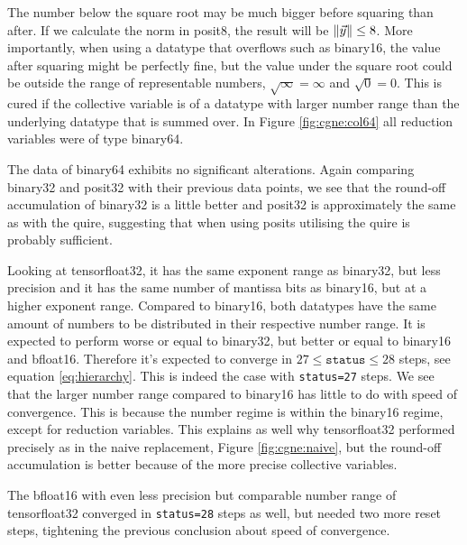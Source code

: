 \documentclass{article}
\theoremstyle{plain} %
\theoremstyle{convention} %
\theoremstyle{remark} %
\def\code#1{\texttt{#1}}
\numberwithin{equation}{section}
\begin{document}
The number below the square root may be much bigger before squaring than after. If we calculate the norm in \gls{posit8}, the result will be $\norm{\vec{y}} \leq 8$. More importantly, when using a datatype that overflows such as \gls{binary16}, the value after squaring might be perfectly fine, but the value under the square root could be outside the range of representable numbers, $\sqrt{\infty} = \infty$ and $\sqrt{0} = 0$. This is cured if the collective variable is of a datatype with larger number range than the underlying datatype that is summed over. In Figure \ref{fig:cgne:col64} all reduction variables were of type \gls{binary64}.

The data of \gls{binary64} exhibits no significant alterations. Again comparing \gls{binary32} and \gls{posit32} with their previous data points, we see that the round-off accumulation of \gls{binary32} is a little better and \gls{posit32} is approximately the same as with the \gls{quire}, suggesting that when using posits utilising the \gls{quire} is probably sufficient.

Looking at \gls{tensorfloat32}, it has the same exponent range as \gls{binary32}, but less precision and it has the same number of mantissa bits as \gls{binary16}, but at a higher exponent range. Compared to \gls{binary16}, both datatypes have the same amount of numbers to be distributed in their respective number range. It is expected to perform worse or equal to \gls{binary32}, but better or equal to \gls{binary16} and \gls{bfloat16}. Therefore it's expected to converge in $27 \le \code{status} \le 28$ steps, see equation \eqref{eq:hierarchy}. This is indeed the case with \code{status=27} steps. We see that the larger number range compared to \gls{binary16} has little to do with speed of convergence. This is because the number regime is within the \gls{binary16} regime, except for reduction variables. This explains as well why \gls{tensorfloat32} performed precisely as in the naive replacement, Figure \ref{fig:cgne:naive}, but the round-off accumulation is better because of the more precise collective variables.

The \gls{bfloat16} with even less precision but comparable number range of \gls{tensorfloat32} converged in \code{status=28} steps as well, but needed two more reset steps, tightening the previous conclusion about speed of convergence.
\end{document}
